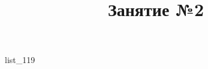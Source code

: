 \documentclass[12pt, a4paper]{article}
\begin{document}
	\title{Занятие №2}
	{list_119}
\end{document}
